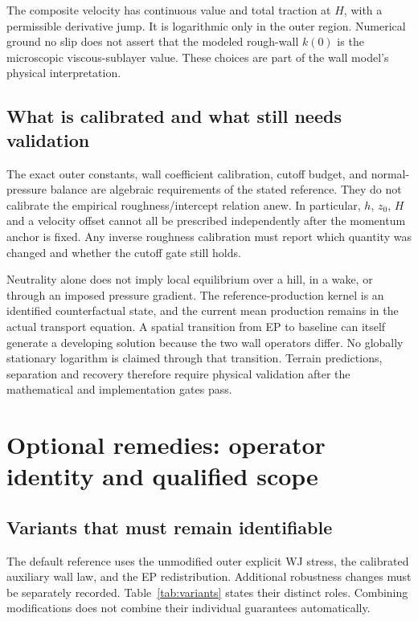 \documentclass[11pt,a4paper]{article}
\numberwithin{equation}{section}
\begin{document}
The composite velocity has continuous value and total traction at $H$,
with a permissible derivative jump. It is logarithmic only in the outer
region. Numerical ground no slip does not assert that the modeled
rough-wall $k(0)$ is the microscopic viscous-sublayer value. These
choices are part of the wall model's physical interpretation.

\subsection{What is calibrated and what still needs validation}
The exact outer constants, wall coefficient calibration, cutoff budget,
and normal-pressure balance are algebraic requirements of the stated
reference. They do not calibrate the empirical roughness/intercept
relation anew. In particular, $h$, $z_0$, $H$ and a velocity offset
cannot all be prescribed independently after the momentum anchor is
fixed. Any inverse roughness calibration must report which quantity
was changed and whether the cutoff gate still holds.

Neutrality alone does not imply local equilibrium over a hill, in a
wake, or through an imposed pressure gradient. The reference-production
kernel is an identified counterfactual state, and the current mean
production remains in the actual transport equation. A spatial
transition from EP to baseline can itself generate a developing
solution because the two wall operators differ. No globally stationary
logarithm is claimed through that transition. Terrain predictions,
separation and recovery therefore require physical validation after
the mathematical and implementation gates pass.

\section{Optional remedies: operator identity and qualified scope}
\label{sec:remedy-scope}
\subsection{Variants that must remain identifiable}
The default reference uses the unmodified outer explicit WJ stress,
the calibrated auxiliary wall law, and the EP redistribution. Additional
robustness changes must be separately recorded. Table~\ref{tab:variants}
states their distinct roles. Combining modifications does not combine
their individual guarantees automatically.
\end{document}
